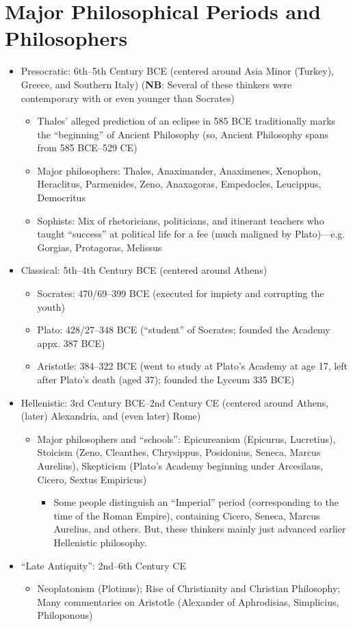 \documentclass[11pt]{article}
\begin{document}
\section*{Major Philosophical Periods and Philosophers}
\begin{itemize}
\item{Presocratic: 6th--5th Century BCE (centered around Asia Minor (Turkey), Greece, and Southern Italy) (\textbf{NB}: Several of these thinkers were contemporary with or even younger than Socrates)}
\begin{itemize}\item{Thales' alleged prediction of an eclipse in 585 BCE traditionally marks the ``beginning'' of Ancient Philosophy} (so, Ancient Philosophy spans from 585 BCE--529 CE)\end{itemize}
\begin{itemize}
\item{Major philosophers: Thales, Anaximander, Anaximenes, Xenophon, Heraclitus, Parmenides, Zeno, Anaxagoras, Empedocles, Leucippus, Democritus}
\item{Sophists: Mix of rhetoricians, politicians, and itinerant teachers who taught ``success'' at political life for a fee (much maligned by Plato)---e.g. Gorgias, Protagoras, Melissus}
\end{itemize}
\item{Classical: 5th--4th Century BCE (centered around Athens)}
\begin{itemize}
\item{Socrates: 470/69--399 BCE (executed for impiety and corrupting the youth)}\item{Plato: 428/27--348 BCE (``student'' of Socrates; founded the Academy appx. 387 BCE)}\item{Aristotle: 384--322 BCE (went to study at Plato's Academy at age 17, left after Plato's death (aged 37); founded the Lyceum 335 BCE)}
\end{itemize}
\item{Hellenistic: 3rd Century BCE--2nd Century CE (centered around Athens, (later) Alexandria, and (even later) Rome)}
\begin{itemize}
\item{Major philosophers and ``schools'': Epicureanism (Epicurus, Lucretius), Stoicism (Zeno, Cleanthes, Chrysippus, Posidonius, Seneca, Marcus Aurelius), Skepticism (Plato's Academy beginning under Arcesilaus, Cicero, Sextus Empiricus)}
\begin{itemize}\item{Some people distinguish an ``Imperial'' period (corresponding to the time of the Roman Empire), containing Cicero, Seneca, Marcus Aurelius, and others. But, these thinkers mainly just advanced earlier Hellenistic philosophy.}\end{itemize}
\end{itemize}
\item{``Late Antiquity'': 2nd--6th Century CE}
\begin{itemize}
\item{Neoplatonism (Plotinus); Rise of Christianity and Christian Philosophy; Many commentaries on Aristotle (Alexander of Aphrodisias, Simplicius, Philoponous)}
\end{itemize}
\end{itemize}
\end{document}
